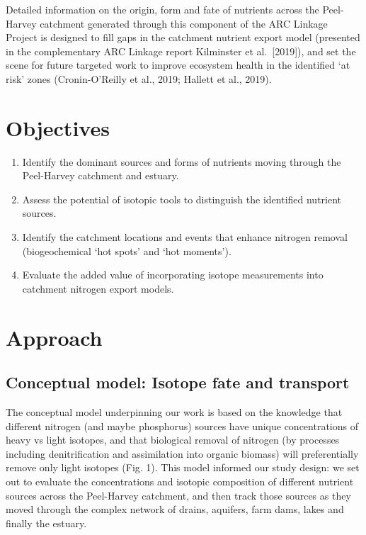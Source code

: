 \documentclass[
]{book}
\begin{document}
Detailed information on the origin, form and fate of nutrients across the Peel-Harvey catchment generated through this component of the ARC Linkage Project is designed to fill gaps in the catchment nutrient export model (presented in the complementary ARC Linkage report Kilminster et al.~{[}2019{]}), and set the scene for future targeted work to improve ecosystem health in the identified `at risk' zones (Cronin-O'Reilly et al., 2019; Hallett et al., 2019).

\hypertarget{objectives-4}{%
\section{Objectives}\label{objectives-4}}

\begin{enumerate}
\def\labelenumi{\arabic{enumi}.}
\item
  Identify the dominant sources and forms of nutrients moving through the Peel-Harvey catchment and estuary.
\item
  Assess the potential of isotopic tools to distinguish the identified nutrient sources.
\item
  Identify the catchment locations and events that enhance nitrogen removal (biogeochemical `hot spots' and `hot moments').
\item
  Evaluate the added value of incorporating isotope measurements into catchment nitrogen export models.
\end{enumerate}

\hypertarget{approach-3}{%
\section{Approach}\label{approach-3}}

\hypertarget{conceptual-model-isotope-fate-and-transport}{%
\subsection{Conceptual model: Isotope fate and transport}\label{conceptual-model-isotope-fate-and-transport}}

The conceptual model underpinning our work is based on the knowledge that different nitrogen (and maybe phosphorus) sources have unique concentrations of heavy vs light isotopes, and that biological removal of nitrogen (by processes including denitrification and assimilation into organic biomass) will preferentially remove only light isotopes (Fig. 1). This model informed our study design: we set out to evaluate the concentrations and isotopic composition of different nutrient sources across the Peel-Harvey catchment, and then track those sources as they moved through the complex network of drains, aquifers, farm dams, lakes and finally the estuary.
\end{document}
